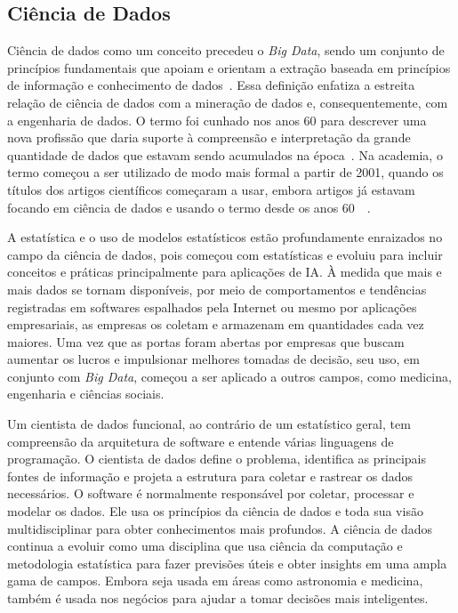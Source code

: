 \documentclass[Portugues,Final]{ic-tese-v3}
\begin{document}
\subsection{Ciência de Dados}

Ciência de dados como um conceito precedeu o \textit{Big Data}, sendo um conjunto de princípios fundamentais que apoiam e orientam a extração baseada em princípios de informação e conhecimento de dados~\cite{Raban_2020}. Essa definição enfatiza a estreita relação de ciência de dados com a mineração de dados e, consequentemente, com a engenharia de dados. O termo foi cunhado nos anos 60 para descrever uma nova profissão que daria suporte à compreensão e interpretação da grande quantidade de dados que estavam sendo acumulados na época~\cite{Foote_2021}. Na academia, o termo começou a ser utilizado de modo mais formal a partir de 2001, quando os títulos dos artigos científicos começaram a usar, embora artigos já estavam focando em ciência de dados e usando o termo desde os anos 60~\cite{Raban_2020}~\cite{Foote_2021}. 

A estatística e o uso de modelos estatísticos estão profundamente enraizados no campo da ciência de dados, pois começou com estatísticas e evoluiu para incluir conceitos e práticas principalmente para aplicações de IA. À medida que mais e mais dados se tornam disponíveis, por meio de comportamentos e tendências registradas em softwares espalhados pela Internet ou mesmo por aplicações empresariais, as empresas os coletam e armazenam em quantidades cada vez maiores. Uma vez que as portas foram abertas por empresas que buscam aumentar os lucros e impulsionar melhores tomadas de decisão, seu uso, em conjunto com \textit{Big Data}, começou a ser aplicado a outros campos, como medicina, engenharia e ciências sociais.

Um cientista de dados funcional, ao contrário de um estatístico geral, tem compreensão da arquitetura de software e entende várias linguagens de programação. O cientista de dados define o problema, identifica as principais fontes de informação e projeta a estrutura para coletar e rastrear os dados necessários. O software é normalmente responsável por coletar, processar e modelar os dados. Ele usa os princípios da ciência de dados e toda sua visão multidisciplinar para obter conhecimentos mais profundos. A ciência de dados continua a evoluir como uma disciplina que usa ciência da computação e metodologia estatística para fazer previsões úteis e obter insights em uma ampla gama de campos. Embora seja usada em áreas como astronomia e medicina, também é usada nos negócios para ajudar a tomar decisões mais inteligentes.
\end{document}
